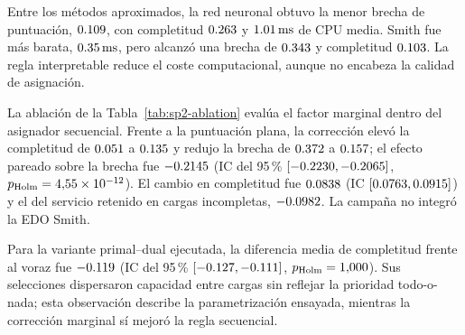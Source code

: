 \begin{table}[!htbp]
  \centering
  \caption[E2 en 1560 mundos pareados. Diferencia de cobertura frente al oráculo de cobertura.]{E2 en $\SPTwoWorlds$ mundos pareados. ``Dif. cobertura'' se define en~\eqref{eq:sp2-capacity-oracle} y no constituye una brecha universal.}
  \label{tab:sp2-main-results}
  \resizebox{\textwidth}{!}{}
\end{table}

Entre los métodos aproximados, la red neuronal obtuvo la menor brecha de puntuación, $0.109$, con completitud $0.263$ y $1.01\,\mathrm{ms}$ de CPU media. Smith fue más barata, $0.35\,\mathrm{ms}$, pero alcanzó una brecha de $0.343$ y completitud $0.103$. La regla interpretable reduce el coste computacional, aunque no encabeza la calidad de asignación.

La ablación de la Tabla~\ref{tab:sp2-ablation} evalúa el factor marginal dentro del asignador secuencial. Frente a la puntuación plana, la corrección elevó la completitud de $0.051$ a $0.135$ y redujo la brecha de $0.372$ a $0.157$; el efecto pareado sobre la brecha fue $-0.2145$ (IC del 95\,\% $[-0.2230,-0.2065]$, $p_{\mathrm{Holm}}=4{,}55\times10^{-12}$). El cambio en completitud fue $0.0838$ (IC $[0.0763,0.0915]$) y el del servicio retenido en cargas incompletas, $-0.0982$. La campaña no integró la EDO Smith.

\begin{table}[!htbp]
  \centering
  \caption{Ablación pareada de las puntuaciones plana y marginal en E2.}
  \label{tab:sp2-ablation}
  \resizebox{0.82\textwidth}{!}{}
\end{table}

Para la variante primal--dual ejecutada, la diferencia media de completitud frente al voraz fue $-0.119$ (IC del 95\,\% $[-0.127,-0.111]$, $p_{\mathrm{Holm}}=1{,}000$). Sus selecciones dispersaron capacidad entre cargas sin reflejar la prioridad todo-o-nada; esta observación describe la parametrización ensayada, mientras la corrección marginal sí mejoró la regla secuencial.

